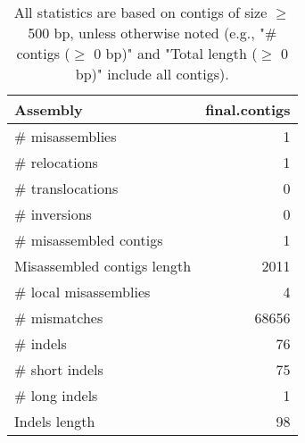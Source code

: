 \documentclass[12pt,a4paper]{article}
\begin{document}
\begin{table}[ht]
\begin{center}
\caption{All statistics are based on contigs of size $\geq$ 500 bp, unless otherwise noted (e.g., "\# contigs ($\geq$ 0 bp)" and "Total length ($\geq$ 0 bp)" include all contigs).}
\begin{tabular}{|l*{1}{|r}|}
\hline
Assembly & final.contigs \\ \hline
\# misassemblies & 1 \\ \hline
\hspace{5mm}\# relocations & 1 \\ \hline
\hspace{5mm}\# translocations & 0 \\ \hline
\hspace{5mm}\# inversions & 0 \\ \hline
\# misassembled contigs & 1 \\ \hline
Misassembled contigs length & 2011 \\ \hline
\# local misassemblies & 4 \\ \hline
\# mismatches & 68656 \\ \hline
\# indels & 76 \\ \hline
\hspace{5mm}\# short indels & 75 \\ \hline
\hspace{5mm}\# long indels & 1 \\ \hline
Indels length & 98 \\ \hline
\end{tabular}
\end{center}
\end{table}
\end{document}
